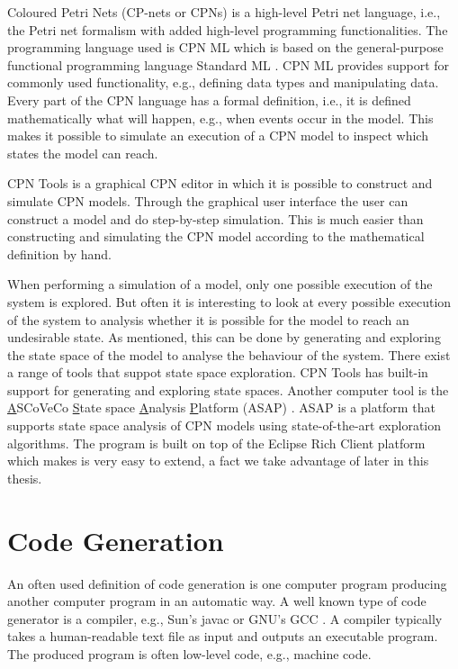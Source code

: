 Coloured Petri Nets (CP-nets or CPNs) \cite{RefWorks:3} is a high-level Petri net language, i.e., the Petri net formalism with added high-level programming functionalities. The programming language used is CPN ML which is based on the general-purpose functional programming language Standard ML \cite{RefWorks:67}. CPN ML provides support for commonly used functionality, e.g., defining data types and manipulating data. Every part of the CPN language has a formal definition, i.e., it is defined mathematically what will happen, e.g., when events occur in the model. This makes it possible to simulate an execution of a CPN model to inspect which states the model can reach. 

CPN Tools \cite{RefWorks:3} is a graphical CPN editor in which it is possible to construct and simulate CPN models. Through the graphical user interface the user can construct a model and do step-by-step simulation. This is much easier than constructing and simulating the CPN model according to the mathematical definition by hand.

When performing a simulation of a model, only one possible execution of the system is explored. But often it is interesting to look at every possible execution of the system to analysis whether it is possible for the model to reach an undesirable state. As mentioned, this can be done by generating and exploring the state space of the model to analyse the behaviour of the system. There exist a range of tools that suppot state space exploration. CPN Tools has built-in support for generating and exploring state spaces. Another computer tool is the \underline{A}SCoVeCo \underline{S}tate space \underline{A}nalysis \underline{P}latform (ASAP) \cite{RefWorks:92}. ASAP is a platform that supports state space analysis of CPN models using state-of-the-art exploration algorithms. The program is built on top of the Eclipse Rich Client platform \cite{RefWorks:73} which makes is very easy to extend, a fact we take advantage of later in this thesis.

\section{Code Generation}
An often used definition of code generation is one computer program producing another computer program in an automatic way. A well known type of code generator is a compiler, e.g., Sun's javac \cite{refWorks:70} or GNU's GCC \cite{refWorks:71}. A compiler typically takes a human-readable text file as input and outputs an executable program. The produced program is often low-level code, e.g., machine code.

